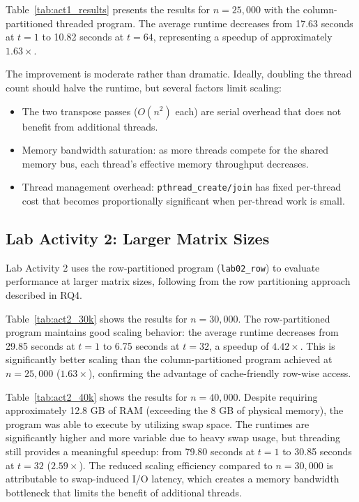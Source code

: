 \documentclass[journal]{IEEEtran}
\begin{document}
Table~\ref{tab:act1_results} presents the results for $n = 25{,}000$ with the column-partitioned threaded program. The average runtime decreases from 17.63 seconds at $t = 1$ to 10.82 seconds at $t = 64$, representing a speedup of approximately $1.63\times$.

The improvement is moderate rather than dramatic. Ideally, doubling the thread count should halve the runtime, but several factors limit scaling:

\begin{itemize}
    \item The two transpose passes ($O(n^2)$ each) are serial overhead that does not benefit from additional threads.
    \item Memory bandwidth saturation: as more threads compete for the shared memory bus, each thread's effective memory throughput decreases.
    \item Thread management overhead: \texttt{pthread\_create/join} has fixed per-thread cost that becomes proportionally significant when per-thread work is small.
\end{itemize}


\subsection{Lab Activity 2: Larger Matrix Sizes}

Lab Activity 2 uses the row-partitioned program (\texttt{lab02\_row}) to evaluate performance at larger matrix sizes, following from the row partitioning approach described in RQ4.

Table~\ref{tab:act2_30k} shows the results for $n = 30{,}000$. The row-partitioned program maintains good scaling behavior: the average runtime decreases from 29.85 seconds at $t = 1$ to 6.75 seconds at $t = 32$, a speedup of $4.42\times$. This is significantly better scaling than the column-partitioned program achieved at $n = 25{,}000$ ($1.63\times$), confirming the advantage of cache-friendly row-wise access.

Table~\ref{tab:act2_40k} shows the results for $n = 40{,}000$. Despite requiring approximately 12.8 GB of RAM (exceeding the 8 GB of physical memory), the program was able to execute by utilizing swap space. The runtimes are significantly higher and more variable due to heavy swap usage, but threading still provides a meaningful speedup: from 79.80 seconds at $t = 1$ to 30.85 seconds at $t = 32$ ($2.59\times$). The reduced scaling efficiency compared to $n = 30{,}000$ is attributable to swap-induced I/O latency, which creates a memory bandwidth bottleneck that limits the benefit of additional threads.
\end{document}

